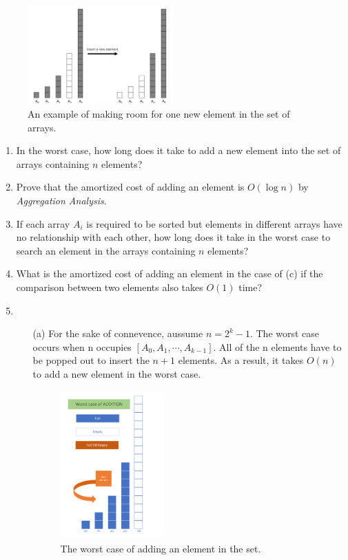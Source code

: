 \documentclass[12pt,a4paper]{article}
\makeatletter
\newtheorem*{solution}{Solution}
\theoremstyle{definition}
\renewenvironment{solution}[1][Solution] {\par\pushQED{\qed}\normalfont\topsep6\p@\@plus6\p@\relax\trivlist\item[\hskip\labelsep\bfseries#1\@addpunct{.}]\ignorespaces}{\popQED\endtrivlist\@endpefalse} \makeatother
\makeatother
\begin{document}
\begin{enumerate}
	\begin{figure}[!htbp]
	\centering
	\includegraphics[width=0.5\textwidth]{Fig-MultiArray.pdf}
	\caption{An example of making room for one new element in the set of arrays.}
	\label{Fig-MultiArray}
	\end{figure}

    \begin{enumerate}
        \item In the worst case, how long does it take to add a new element into the set of arrays containing $n$ elements?
        \item Prove that the amortized cost of adding an element is $O(\log n)$ by \emph{Aggregation Analysis}.
        \item If each array $A_i$ is required to be sorted but elements in different arrays have no relationship with each other, how long does it take in the worst case to search an element in the arrays containing $n$ elements? 
\item What is the amortized cost of adding an element in the case of (c) if the comparison between two elements also takes $O(1)$ time?
    \begin{solution}
    ~\\
    \begin{enumerate}
        \item [(a)] For the sake of connevence, aussume $n=2^k-1$. The worst case occurs when n occupies $[A_0,A_1,\cdots,A_{k-1}]$. All of the n elements have to be popped out to insert the $n+1$ elements. As a result, it takes $O(n)$ to add a new element in the worst case.

        \begin{figure}[htbp]
        	\centering
        	\includegraphics[width=0.4\textwidth]{WorstAddition.pdf}
        	\caption{The worst case of adding an element in the set.}
        	\label{WorstAddition}
    	\end{figure}        
    	

\end{enumerate}
\end{solution}
\end{enumerate}
\end{enumerate}
\end{document}
